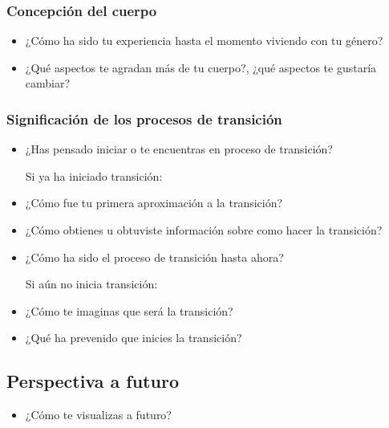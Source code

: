 \subsubsection{Concepción del cuerpo}

\begin{itemize}
\item
  ¿Cómo ha sido tu experiencia hasta el momento viviendo con tu género?
\item
  ¿Qué aspectos te agradan más de tu cuerpo?, ¿qué aspectos te gustaría
  cambiar?
\end{itemize}

\subsubsection{Significación de los procesos de transición}

\begin{itemize}
\item
  ¿Has pensado iniciar o te encuentras en proceso de transición?

Si ya ha iniciado transición:

\item
  ¿Cómo fue tu primera aproximación a la transición?
\item
  ¿Cómo obtienes u obtuviste información sobre como hacer la transición?
\item
  ¿Cómo ha sido el proceso de transición hasta ahora?

Si aún no inicia transición:

\item
  ¿Cómo te imaginas que será la transición?
\item
  ¿Qué ha prevenido que inicies la transición?
\end{itemize}

\subsection{Perspectiva a futuro}

\begin{itemize}
\item
  ¿Cómo te visualizas a futuro?
\end{itemize}
